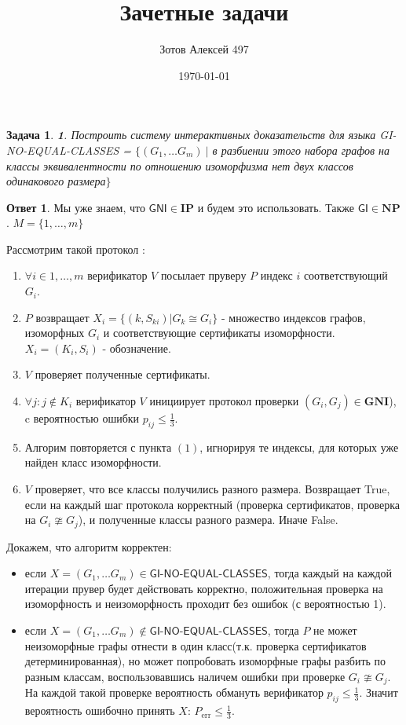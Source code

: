 \documentclass[a4paper]{article}
\title{Зачетные задачи}
\author{Зотов Алексей 497}
\date{\today}
\theoremstyle{plain}
\newtheorem*{task}{Задача}
\theoremstyle{definition}
\newtheorem*{answer}{Ответ}
\begin{document}
\maketitle

\begin{task}{\textbf 1.}
Построить систему интерактивных доказательств для языка \textsf{GI-NO-EQUAL-CLASSES} = $\{(G_1, \ldots G_m) \ |$  в разбиении этого набора графов на классы эквивалентности по отношению изоморфизма нет двух классов одинакового размера$\}$
\end{task}
\begin{answer}  
    Мы уже знаем, что $\textsf{GNI} \in \mathbf{IP}$ и будем это использовать. Также $\textsf{GI} \in \mathbf{NP}$. $M = \{1,\ldots,m\}$
    \item Рассмотрим такой протокол :
    \begin{enumerate}
        \item $\forall i \in 1,\ldots , m$  верификатор $V$ посылает пруверу $P$ индекс $i$ соответствующий $G_i$.
        \item $P$ возвращает $X_i = \{(k,S_{ki}) | G_k \cong G_i\}$ - множество индексов графов, изоморфных $G_i$ и соответствующие сертификаты изоморфности. $X_i = (K_i,S_i)$ - обозначение.
        \item $V$ проверяет полученные сертификаты. 
        \item $\forall j : j \notin K_i$ верификатор $V$ инициирует протокол проверки $(G_i,G_j) \in \textbf{GNI}$), c вероятностью ошибки $p_{ij} \leq \frac{1}{3}$. 
        \item Алгорим повторяется с пункта $(1)$, игнорируя те индексы, для которых уже найден класс изоморфности.
        \item $V$ проверяет, что все классы получились разного размера. Возвращает \textsf{True}, если на каждый шаг протокола корректный (проверка сертификатов, проверка на $G_i \ncong G_j$), и полученные классы разного размера. Иначе \textsf{False}.
    \end{enumerate}
    Докажем, что алгоритм корректен: 
    \begin{itemize}
        \item если $X = (G_1, \ldots G_m) \in \textsf{GI-NO-EQUAL-CLASSES}$, тогда каждый на каждой итерации прувер будет действовать корректно, положительная проверка на изоморфность и неизоморфность проходит без ошибок (с вероятностью 1). 
        \item если $X = (G_1, \ldots G_m) \notin \textsf{GI-NO-EQUAL-CLASSES}$, тогда $P$ не может неизоморфные графы отнести в один класс(т.к. проверка сертификатов детерминированная), но может попробовать изоморфные графы разбить по разным классам, воспользовавшись наличем ошибки при проверке $G_i \ncong G_j$. На каждой такой проверке вероятность обмануть верификатор $p_{ij} \leq \frac{1}{3}$. Значит вероятность ошибочно принять $X$: $P_{\text{err}} \leq \frac{1}{3}$. 
    \end{itemize}
\end{answer}
\end{document}
